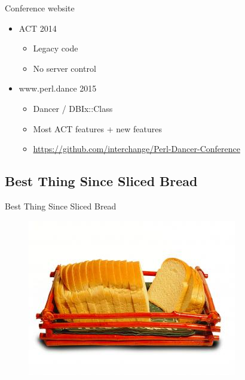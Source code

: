 
\begin{frame}[fragile]{Conference website}
\begin{itemize}
\item ACT 2014
\begin{itemize}
\item Legacy code
\item No server control
\end{itemize}
\item www.perl.dance 2015
\begin{itemize}
\item Dancer / DBIx::Class
\item Most ACT features + new features
\item \url{https://github.com/interchange/Perl-Dancer-Conference}
\end{itemize}
\end{itemize}
\end{frame}

\subsection{Best Thing Since Sliced Bread}

\begin{frame}{Best Thing Since Sliced Bread}


\begin{figure}[!ht]
\centering
\includegraphics[width=1\linewidth]{img/sliced-bread.jpg}
\end{figure}
\end{frame}

